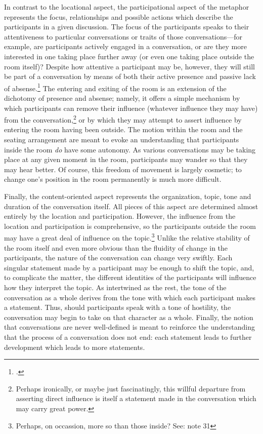 \documentclass{article}
\begin{document}
In contrast to the locational aspect, the participational aspect of the metaphor represents the focus, relationships and possible actions which describe the participants in a given discussion.
The focus of the participants speaks to their attentiveness to particular conversations or traits of those conversations---for example, are participants actively engaged in a conversation, or are they more interested in one taking place further away (or even one taking place outside the room itself)?
Despite how attentive a participant may be, however, they will still be part of a conversation by means of both their active presence and passive lack of absense.\footcite{bickford96,giddens86}
The entering and exiting of the room is an extension of the dichotomy of presence and absense; namely, it offers a simple mechanism by which participants can remove their influence (whatever influence they may have) from the conversation,\footnote{Perhaps ironically, or maybe just fascinatingly, this willful departure from asserting direct influence is itself a statement made in the conversation which may carry great power.} or by which they may attempt to assert influence by entering the room having been outside.
The motion within the room and the seating arrangement are meant to evoke an understanding that participants inside the room \emph{do} have some autonomy.
As various conversations may be taking place at any given moment in the room, participants may wander so that they may hear better.
Of course, this freedom of movement is largely cosmetic; to change one's position in the room permanently is much more difficult.

Finally, the content-oriented aspect represents the organization, topic, tone and duration of the conversation itself.
All pieces of this aspect are determined almost entirely by the location and participation.
However, the influence from the location and participation is comprehensive, so the participants outside the room may have a great deal of influence on the topic.\footnote{Perhaps, on occassion, more so than those inside? See: note 31}
Unlike the relative stability of the room itself and even more obvious than the fluidity of change in the participants, the nature of the conversation can change very swiftly.
Each singular statement made by a participant may be enough to shift the topic, and, to complicate the matter, the different identities of the participants will influence how they interpret the topic.
As intertwined as the rest, the tone of the conversation as a whole derives from the tone with which each participant makes a statement.
Thus, should participants speak with a tone of hostility, the conversation may begin to take on that character as a whole.
Finally, the notion that conversations are never well-defined is meant to reinforce the understanding that the process of a conversation does not end: each statement leads to further development which leads to more statements.
\end{document}
